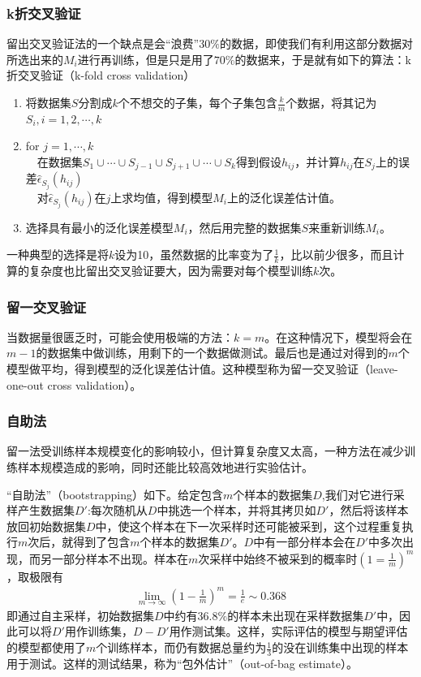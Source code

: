 \subsubsection{k折交叉验证}
留出交叉验证法的一个缺点是会“浪费”$30\%$的数据，即使我们有利用这部分数据对所选出来的$M_i$进行再训练，但是只是用了$70\%$的数据来，于是就有如下的算法：k折交叉验证（k-fold cross validation）
\begin{enumerate}[1]
\item 将数据集$S$分割成$k$个不想交的子集，每个子集包含$\frac{k}{m}$个数据，将其记为$S_i,i=1,2,\cdots,k$
\item for $j=1,\cdots,k$\\
\indent\ \ 在数据集$S_1\cup\cdots\cup S_{j-1}\cup S_{j+1}\cup\cdots\cup S_k$得到假设$h_{ij}$，并计算$h_{ij}$在$S_j$上的误差$\hat{\epsilon}_{S_j}(h_{ij})$\\
\indent\ \ 对$\hat{\epsilon}_{S_j}(h_{ij})$在$j$上求均值，得到模型$M_i$上的泛化误差估计值。
\item 选择具有最小的泛化误差模型$M_i$，然后用完整的数据集$S$来重新训练$M_i$。
\end{enumerate}
一种典型的选择是将$k$设为10，虽然数据的比率变为了$\frac{1}{k}$，比以前少很多，而且计算的复杂度也比留出交叉验证要大，因为需要对每个模型训练$k$次。
\subsubsection{留一交叉验证}
当数据量很匮乏时，可能会使用极端的方法：$k=m$。在这种情况下，模型将会在$m-1$的数据集中做训练，用剩下的一个数据做测试。最后也是通过对得到的$m$个模型做平均，得到模型的泛化误差估计值。这种模型称为留一交叉验证（leave-one-out cross validation）。

\subsubsection{自助法}
留一法受训练样本规模变化的影响较小，但计算复杂度又太高，一种方法在减少训练样本规模造成的影响，同时还能比较高效地进行实验估计。

“自助法”（bootstrapping）如下。给定包含$m$个样本的数据集$D$,我们对它进行采样产生数据集$D'$:每次随机从$D$中挑选一个样本，并将其拷贝如$D'$，然后将该样本放回初始数据集$D$中，使这个样本在下一次采样时还可能被采到，这个过程重复执行$m$次后，就得到了包含$m$个样本的数据集$D'$。$D$中有一部分样本会在$D'$中多次出现，而另一部分样本不出现。样本在$m$次采样中始终不被采到的概率时$(1=\frac{1}{m})^m$，取极限有
\begin{eqnarray}
\lim_{m\rightarrow\infty}\left( 1-\frac{1}{m} \right)^m=\frac{1}{e}\sim 0.368
\end{eqnarray}
即通过自主采样，初始数据集$D$中约有$36.8\%$的样本未出现在采样数据集$D'$中，因此可以将$D'$用作训练集，$D-D'$用作测试集。这样，实际评估的模型与期望评估的模型都使用了$m$个训练样本，而仍有数据总量约为$\frac{1}{3}$的没在训练集中出现的样本用于测试。这样的测试结果，称为“包外估计”（out-of-bag estimate）。

